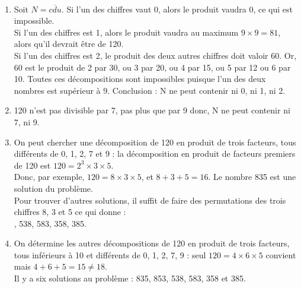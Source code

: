 \ \\ [-5mm]
   \begin{enumerate}
      \item Soit $N=\overline{cdu}$. Si l'un des chiffres vaut 0, alors le produit vaudra 0, ce qui est  impossible. \\
         Si l'un des chiffres est 1, alors le produit vaudra au maximum $9\times9 =81$, alors qu'il devrait être de 120. \\
         Si l'un des chiffres est 2, le produit des deux autres chiffres doit valoir $60$. Or, 60 est le produit de 2 par 30, ou 3 par 20, ou 4 par 15, ou 5 par 12 ou 6 par 10. Toutes ces décompositions sont impossibles puisque l'un des deux nombres est supérieur à 9. Conclusion : {\blue N ne peut contenir ni 0, ni 1, ni 2.}
      \item 120 n'est pas divisible par 7, pas plus que par 9 donc, {\blue N ne peut contenir ni 7, ni 9.}
      \item On peut  chercher une décomposition de 120 en produit de trois facteurs, tous différents de 0, 1, 2, 7 et 9 : la décomposition en produit de facteurs premiers de 120 est $120 =2^3\times3\times5$. \\
         Donc, par exemple, $120 =8\times3\times5$, et $8+3+5 =16$. {\blue Le nombre 835 est une solution du problème.} \\
         Pour trouver d'autres solutions, il suffit de faire des permutations des trois chiffres 8, 3 et 5 ce qui donne : \\
         {, 538, 583, 358, 385.}
      \item On détermine les autres décompositions de 120 en produit de trois facteurs, tous inférieurs à 10 et différents de 0, 1, 2, 7, 9 : seul $120 =4\times6\times5$ convient mais $4+6+5 =15 \neq 18$. \\
         {\blue Il y a six solutions au problème : 835, 853, 538, 583, 358 et 385.}
   \end{enumerate}
